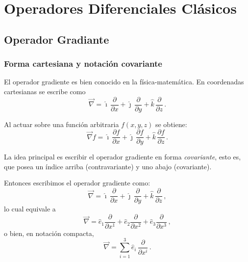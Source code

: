 \documentclass[../apunte_mecanica_clasica.tex]{subfiles}%
\begin{document}
\chapter{Operadores Diferenciales Clásicos}

\section{Operador Gradiante}


\subsection{Forma cartesiana y notación covariante}

El operador gradiente es bien conocido en la física-matemática.  
En coordenadas cartesianas se escribe como
\begin{equation*}
    \vec{\nabla} = \hat{\imath}\,\frac{\partial}{\partial x}
    + \hat{\jmath}\,\frac{\partial}{\partial y}
    + \hat{k}\,\frac{\partial}{\partial z} \,.
\end{equation*}

Al actuar sobre una función arbitraria $f(x,y,z)$ se obtiene:
\begin{equation*}
    \vec{\nabla} f =
    \hat{\imath}\,\frac{\partial f}{\partial x}
    + \hat{\jmath}\,\frac{\partial f}{\partial y}
    + \hat{k}\,\frac{\partial f}{\partial z} \,.
\end{equation*}

La idea principal es escribir el operador gradiente en forma 
\textit{covariante}, esto es, que posea un índice arriba (contravariante) 
y uno abajo (covariante).  

Entonces escribimos el operador gradiente como:
\begin{equation*}
    \vec{\nabla} = \hat{\imath}\,\frac{\partial}{\partial x}
    + \hat{\jmath}\,\frac{\partial}{\partial y}
    + \hat{k}\,\frac{\partial}{\partial z} \,,
\end{equation*}
lo cual equivale a
\begin{equation*}
    \vec{\nabla} = \hat{e}_1 \frac{\partial}{\partial x^1}
    + \hat{e}_2 \frac{\partial}{\partial x^2}
    + \hat{e}_3 \frac{\partial}{\partial x^3} \,,
\end{equation*}
o bien, en notación compacta,
\begin{equation*}
    \vec{\nabla} = \sum_{i=1}^3 \hat{e}_i \,\frac{\partial}{\partial x^i} \,.
\end{equation*}
\end{document}
